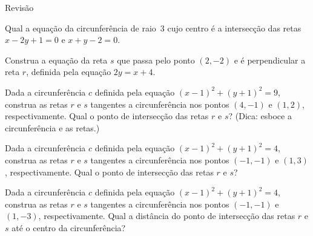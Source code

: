 
\begin{exercicios}{Revisão}
    
    \begin{exercicio}
        Qual a equação da circunferência de raio~$3$ cujo centro é a intersecção das retas $x -2y +1 = 0$ e $x + y - 2 = 0$.
    \end{exercicio}
        
    \begin{exercicio}
        Construa a equação da reta $s$ que passa pelo ponto $(2,-2)$ e é perpendicular a reta $r$, definida pela equação $2y=x+4$. 
    \end{exercicio}
        
    \begin{exercicio}
        Dada a circunferência $c$ definida pela equação $(x-1)^2 + (y+1)^2=9$, construa as retas $r$ e $s$ tangentes
        a circunferência nos pontos $(4,-1)$ e $(1,2)$, respectivamente. Qual o ponto de intersecção das retas $r$ e $s$?
        (Dica: esboce a circunferência e as retas.)
    \end{exercicio}
        
    \begin{exercicio}
        Dada a circunferência $c$ definida pela equação $(x-1)^2 + (y+1)^2=4$, construa as retas $r$ e $s$ tangentes
        a circunferência nos pontos $(-1,-1)$ e $(1,3)$, respectivamente. Qual o ponto de intersecção das retas $r$ e $s$?
    \end{exercicio}
        
    \begin{exercicio}
        Dada a circunferência $c$ definida pela equação $(x-1)^2 + (y+1)^2=4$, construa as retas $r$ e $s$ tangentes
        a circunferência nos pontos $(-1,-1)$ e $(1,-3)$, respectivamente. Qual a distância do ponto de intersecção 
        das retas $r$ e $s$ até o centro da circunferência?
    \end{exercicio}
        

\end{exercicios}
